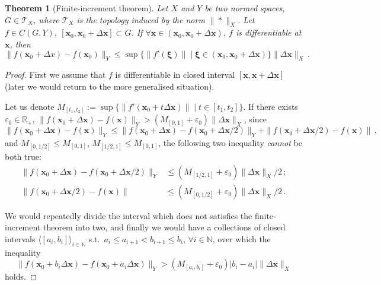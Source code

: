 \documentclass[openany]{book}
\theoremstyle{plain}
\newtheorem{theorem}{Theorem}[section] %
\theoremstyle{definition}
\newcommand*{\bv}{\boldsymbol} %
\begin{document}
\begin{theorem}[Finite-increment theorem]
	\label{theorem: finite-increment theorem}
	Let $X$ and $Y$ be two normed spaces, $G \in \mathscr T_X$, where $\mathscr T_X$ is the topology induced by the norm $\|*\|_X$. 
	Let $f \in C(G, Y)$, $[\bv x_0, \bv x_0 + \Delta \bv x] \subset G$.
	If $\forall \bv x \in (\bv x_0, \bv x_0 + \Delta \bv x)$, $f$ is differentiable at $\bv x$, then
	\begin{equation*}
		\|f(\bv x_0 + \Delta x) - f(\bv x_0)\|_Y 
			\leq \sup \{\|f'(\bv \xi)\|  \mid \bv \xi \in (\bv x_0, \bv x_0 + \Delta \bv x)\} \|\Delta \bv x\|_X\,.
	\end{equation*}
\end{theorem}
\begin{proof}
	First we assume that $f$ is differentiable in closed interval $[\bv x, \bv x + \Delta \bv x]$ (later we would return to the more generalised situation).

	Let us denote $M_{[t_1, t_2]} := \sup \{\|f'(\bv x_0 + t\Delta \bv x)\|  \mid t \in [t_1, t_2] \}$. 
	If there exists $\varepsilon_0 \in \mathbb R_+$, $\|f(\bv x_0 + \Delta \bv x) - f(\bv x)\|_Y > (M_{[0, 1]} + \varepsilon_0) \|\Delta \bv x\|_X$, since 
	\begin{equation*}
		\|f(\bv x_0 + \Delta \bv x) - f(\bv x)\|_Y \leq
		\|f(\bv x_0 + \Delta \bv x) - f(\bv x_0 + \Delta \bv x / 2)\|_Y
			+ \|f(\bv x_0 + \Delta \bv x / 2) - f(\bv x)\|\,,
	\end{equation*}
	and $M_{[0, 1/2]} \leq M_{[0, 1]}$, $M_{[1/2, 1]} \leq M_{[0, 1]}$, the following two inequality \emph{cannot} be both true: 
	\begin{align*}
		\|f(\bv x_0 + \Delta \bv x) - f(\bv x_0 + \Delta \bv x / 2)\|_Y 
			&\leq (M_{[1/2, 1]} + \varepsilon_0) \|\Delta \bv x\|_X/2\,;
		\\
		\|f(\bv x_0 + \Delta \bv x / 2) - f(\bv x)\| 
			&\leq (M_{[0, 1/2]} + \varepsilon_0) \|\Delta \bv x\|_X / 2 \,.
	\end{align*} 
	
	We would repeatedly divide the interval which does not satisfies the finite-increment theorem into two, and finally we would have a collections of closed intervals $\langle[a_i, b_i]\rangle_{i \in \mathbb N}$ s.t.\ $a_i \leq a_{i + 1} < b_{i +1} \leq b_i$, $\forall i \in \mathbb N$, over which the inequality
	\begin{equation*}
		\|f(\bv x_0 + b_i \Delta \bv x) - f(\bv x_0 + a_i \Delta \bv x)\|_Y
			> (M_{[a_i, b_i]} + \varepsilon_0) |b_i - a_i| \|\Delta \bv x\|_X
	\end{equation*}
	holds.


\end{proof}
\end{document}
